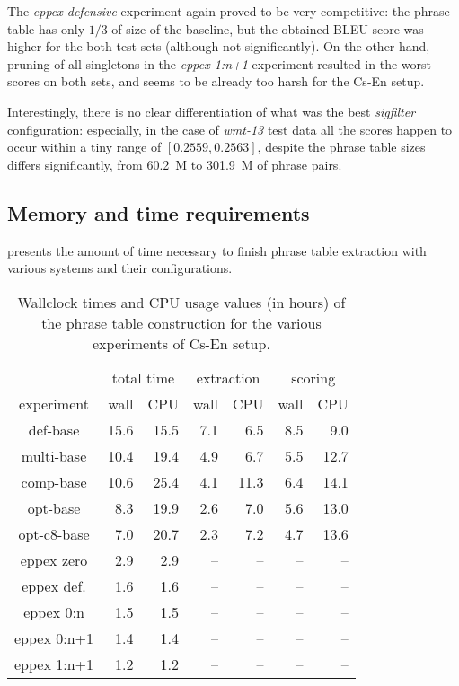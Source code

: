 The \emph{eppex defensive} experiment again proved to be very competitive:
the phrase table has only $1/3$ of size of the baseline,
but the obtained BLEU score was higher for the both test sets (although not significantly).
On the other hand, pruning of all singletons in the \emph{eppex 1:n+1} experiment
resulted in the worst scores on both sets, and seems to be already too harsh for
the Cs-En setup.

Interestingly, there is no clear differentiation of what was the best \emph{sigfilter}
configuration: especially, in the case of \emph{wmt-13} test data all the scores
happen to occur within a tiny range of $[0.2559, 0.2563]$, despite the phrase table sizes
differs significantly, from 60.2~M to 301.9~M of phrase pairs.

\subsection{Memory and time requirements}

 presents the amount of time necessary to finish
phrase table extraction with various systems and their configurations.

\begin{table}[ht]
\centering
\begin{tabular}{ | c | r r | r r | r r | }
\hline
 & \multicolumn{2}{|c|}{total time} & \multicolumn{2}{|c|}{extraction} & \multicolumn{2}{|c|}{scoring} \\
experiment & wall & CPU & wall & CPU & wall & CPU \\
\hline
\hline
def-base      & 15.6 & 15.5 & 7.1 & 6.5 & 8.5 & 9.0 \\
multi-base    & 10.4 & 19.4 & 4.9 & 6.7 & 5.5 & 12.7 \\
comp-base     & 10.6 & 25.4 & 4.1 & 11.3 & 6.4 & 14.1 \\
opt-base      & 8.3 & 19.9 & 2.6 & 7.0 & 5.6 & 13.0 \\
opt-c8-base   & 7.0 & 20.7 & 2.3 & 7.2 & 4.7 & 13.6 \\
eppex zero    & 2.9 & 2.9 & -- & -- & -- & -- \\
\hline
eppex def.    & 1.6 & 1.6 & -- & -- & -- & -- \\
eppex 0:n     & 1.5 & 1.5 & -- & -- & -- & -- \\
eppex 0:n+1   & 1.4 & 1.4 & -- & -- & -- & -- \\
eppex 1:n+1   & 1.2 & 1.2 & -- & -- & -- & -- \\
\hline
\end{tabular}
\caption{\label{cs-en-wmt13-time-benchmarks}
Wallclock times and CPU usage values (in hours) of the phrase table
construction for the various experiments of Cs-En setup.}
\end{table}

